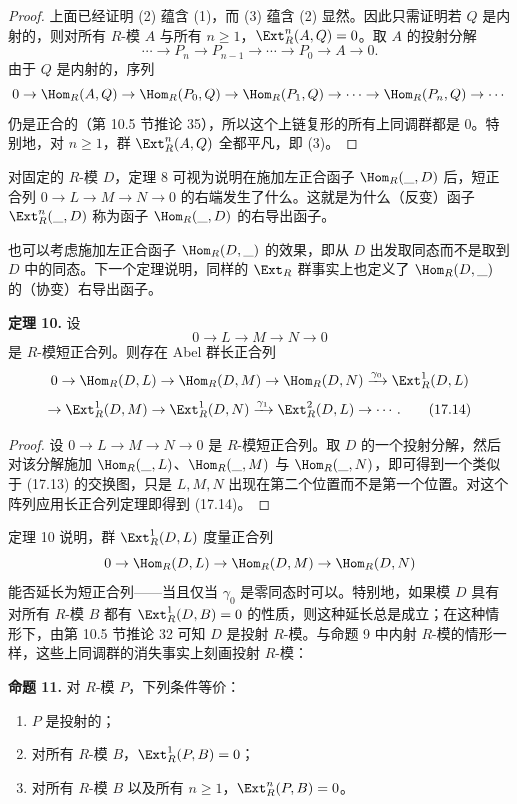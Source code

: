 \begin{proof}
上面已经证明 (2) 蕴含 (1)，而 (3) 蕴含 (2) 显然。因此只需证明若 $Q$ 是内射的，则对所有 $R$-模 $A$ 与所有 $n\geq1$，$\Ext_R^n(A,Q)=0$。取 $A$ 的投射分解
\[
  \cdots\to P_n\to P_{n-1}\to\cdots\to P_0\to A\to0.
\]
由于 $Q$ 是内射的，序列
\[
  0\to\Hom_R(A,Q)\to\Hom_R(P_0,Q)\to\Hom_R(P_1,Q)\to\cdots\to\Hom_R(P_n,Q)\to\cdots
\]
仍是正合的（第 10.5 节推论 35），所以这个上链复形的所有上同调群都是 $0$。特别地，对 $n\geq1$，群 $\Ext_R^n(A,Q)$ 全都平凡，即 (3)。
\end{proof}

对固定的 $R$-模 $D$，定理 8 可视为说明在施加左正合函子 $\Hom_R(\_,D)$ 后，短正合列 $0\to L\to M\to N\to0$ 的右端发生了什么。这就是为什么（反变）函子 $\Ext_R^n(\_,D)$ 称为函子 $\Hom_R(\_,D)$ 的右导出函子。

也可以考虑施加左正合函子 $\Hom_R(D,\_)$ 的效果，即从 $D$ 出发取同态而不是取到 $D$ 中的同态。下一个定理说明，同样的 $\Ext_R$ 群事实上也定义了 $\Hom_R(D,\_)$ 的（协变）右导出函子。

\medskip
\noindent\textbf{定理 10.} 设
\[
  0\to L\to M\to N\to0
\]
是 $R$-模短正合列。则存在 Abel 群长正合列
\[
0\to\Hom_R(D,L)\to\Hom_R(D,M)\to\Hom_R(D,N)\xrightarrow{\gamma_0}\Ext_R^1(D,L)
\]
\[
\to\Ext_R^1(D,M)\to\Ext_R^1(D,N)\xrightarrow{\gamma_1}\Ext_R^2(D,L)\to\cdots .
\tag{17.14}
\]

\begin{proof}
设 $0\to L\to M\to N\to0$ 是 $R$-模短正合列。取 $D$ 的一个投射分解，然后对该分解施加 $\Hom_R(\_,L)$、$\Hom_R(\_,M)$ 与 $\Hom_R(\_,N)$，即可得到一个类似于 (17.13) 的交换图，只是 $L,M,N$ 出现在第二个位置而不是第一个位置。对这个阵列应用长正合列定理即得到 (17.14)。
\end{proof}

定理 10 说明，群 $\Ext_R^1(D,L)$ 度量正合列
\[
  0\to\Hom_R(D,L)\to\Hom_R(D,M)\to\Hom_R(D,N)
\]
能否延长为短正合列——当且仅当 $\gamma_0$ 是零同态时可以。特别地，如果模 $D$ 具有对所有 $R$-模 $B$ 都有 $\Ext_R^1(D,B)=0$ 的性质，则这种延长总是成立；在这种情形下，由第 10.5 节推论 32 可知 $D$ 是投射 $R$-模。与命题 9 中内射 $R$-模的情形一样，这些上同调群的消失事实上刻画投射 $R$-模：

\medskip
\noindent\textbf{命题 11.} 对 $R$-模 $P$，下列条件等价：
\begin{enumerate}[label=(\arabic*)]
  \item $P$ 是投射的；
  \item 对所有 $R$-模 $B$，$\Ext_R^1(P,B)=0$；
  \item 对所有 $R$-模 $B$ 以及所有 $n\geq1$，$\Ext_R^n(P,B)=0$。
\end{enumerate}

